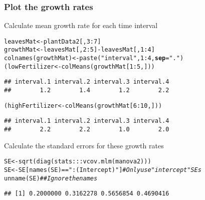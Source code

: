 \documentclass[color=usenames,dvipsnames]{beamer}\usepackage[]{graphicx}\usepackage[]{color}
\makeatletter
\newcommand{\hlnum}[1]{\textcolor[rgb]{0.69,0.494,0}{#1}}%
\newcommand{\hlstr}[1]{\textcolor[rgb]{0.749,0.012,0.012}{#1}}%
\newcommand{\hlcom}[1]{\textcolor[rgb]{0.514,0.506,0.514}{\textit{#1}}}%
\newcommand{\hlopt}[1]{\textcolor[rgb]{0,0,0}{#1}}%
\newcommand{\hlstd}[1]{\textcolor[rgb]{0,0,0}{#1}}%
\newcommand{\hlkwb}[1]{\textcolor[rgb]{0,0.341,0.682}{#1}}%
\newcommand{\hlkwc}[1]{\textcolor[rgb]{0,0,0}{\textbf{#1}}}%
\newcommand{\hlkwd}[1]{\textcolor[rgb]{0.004,0.004,0.506}{#1}}%
\newenvironment{kframe}{%
 \def\at@end@of@kframe{}%
 \ifinner\ifhmode%
  \def\at@end@of@kframe{\end{minipage}}%
  \begin{minipage}{\columnwidth}%
 \fi\fi%
 \def\FrameCommand##1{\hskip\@totalleftmargin \hskip-\fboxsep
 \colorbox{shadecolor}{##1}\hskip-\fboxsep
     \hskip-\linewidth \hskip-\@totalleftmargin \hskip\columnwidth}%
 \MakeFramed {\advance\hsize-\width
   \@totalleftmargin\z@ \linewidth\hsize
   \@setminipage}}%
 {\par\unskip\endMakeFramed%
 \at@end@of@kframe}
\newenvironment{knitrout}{}{} %
\makeatother
\begin{document}
\begin{frame}[fragile]
  \frametitle{Plot the growth rates}
  \small
  {%
    Calculate mean growth rate for each time interval}%
  \pause
\begin{knitrout}\footnotesize
{}\color{fgcolor}\begin{kframe}
\begin{alltt}
\hlstd{leavesMat} \hlkwb{<-} \hlstd{plantData2[,}\hlnum{3}\hlopt{:}\hlnum{7}\hlstd{]}
\hlstd{growthMat} \hlkwb{<-} \hlstd{leavesMat[,}\hlnum{2}\hlopt{:}\hlnum{5}\hlstd{]} \hlopt{-} \hlstd{leavesMat[,}\hlnum{1}\hlopt{:}\hlnum{4}\hlstd{]}
\hlkwd{colnames}\hlstd{(growthMat)} \hlkwb{<-} \hlkwd{paste}\hlstd{(}\hlstr{"interval"}\hlstd{,} \hlnum{1}\hlopt{:}\hlnum{4}\hlstd{,} \hlkwc{sep}\hlstd{=}\hlstr{"."}\hlstd{)}
\hlstd{(lowFertilizer} \hlkwb{<-} \hlkwd{colMeans}\hlstd{(growthMat[}\hlnum{1}\hlopt{:}\hlnum{5}\hlstd{,]))}
\end{alltt}
\begin{verbatim}
## interval.1 interval.2 interval.3 interval.4 
##        1.2        1.4        1.2        2.2
\end{verbatim}
\begin{alltt}
\hlstd{(highFertilizer} \hlkwb{<-} \hlkwd{colMeans}\hlstd{(growthMat[}\hlnum{6}\hlopt{:}\hlnum{10}\hlstd{,]))}
\end{alltt}
\begin{verbatim}
## interval.1 interval.2 interval.3 interval.4 
##        2.2        2.2        1.0        2.0
\end{verbatim}
\end{kframe}
\end{knitrout}
\pause
{Calculate the standard errors for these growth rates}
\footnotesize
\begin{knitrout}\footnotesize
{}\color{fgcolor}\begin{kframe}
\begin{alltt}
\hlstd{SE} \hlkwb{<-} \hlkwd{sqrt}\hlstd{(}\hlkwd{diag}\hlstd{(stats}\hlopt{:::}\hlkwd{vcov.mlm}\hlstd{(manova2)))}
\hlstd{SE} \hlkwb{<-} \hlstd{SE[}\hlkwd{names}\hlstd{(SE)}\hlopt{==}\hlstr{":(Intercept)"}\hlstd{]} \hlcom{# Only use "intercept" SEs}
\hlkwd{unname}\hlstd{(SE)} \hlcom{## Ignore the names}
\end{alltt}
\begin{verbatim}
## [1] 0.2000000 0.3162278 0.5656854 0.4690416
\end{verbatim}
\end{kframe}
\end{knitrout}
\end{frame}
\end{document}
